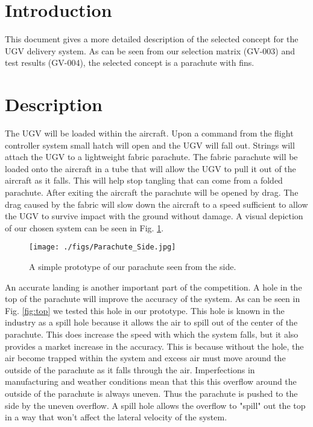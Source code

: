 \documentclass[]{auvsi_doc}
\begin{document}
\begin{AUVSITitlePage}
\begin{artifacttable}
\end{artifacttable}
\end{AUVSITitlePage}

\section{Introduction}
This document gives a more detailed description of the selected concept for the UGV delivery system. As can be seen from our selection matrix (GV-003) and test results (GV-004), the selected concept is a parachute with fins.

\section{Description}

The UGV will be loaded within the aircraft. Upon a command from the flight controller system small hatch will open and the UGV will fall out. Strings will attach the UGV to a lightweight fabric parachute. The fabric parachute will be loaded onto the aircraft in a tube that will allow the UGV to pull it out of the aircraft as it falls. This will help stop tangling that can come from a folded parachute. After exiting the aircraft the parachute will be opened by drag. The drag caused by the fabric will slow down the aircraft to a speed sufficient to allow the UGV to survive impact with the ground without damage. A visual depiction of our chosen system can be seen in Fig. \ref{fig:side}.

\begin{figure}[h]
\centering
\texttt{[image: ./figs/Parachute\_Side.jpg]}
\caption{A simple prototype of our parachute seen from the side.}
\label{fig:side}
\end{figure}

An accurate landing is another important part of the competition. A hole in the top of the parachute will improve the accuracy of the system. As can be seen in Fig. \ref{fig:top} we tested this hole in our prototype. This hole is known in the industry as a spill hole because it allows the air to spill out of the center of the parachute. This does increase the speed with which the system falls, but it also provides a market increase in the accuracy. This is because without the hole, the air become trapped within the system and excess air must move around the outside of the parachute as it falls through the air. Imperfections in manufacturing and weather conditions mean that this this overflow around the outside of the  parachute is always uneven. Thus the parachute is pushed to the side by the uneven overflow. A spill hole allows the overflow to "spill" out the top in a way that won't affect the lateral velocity of the system.
\end{document}
